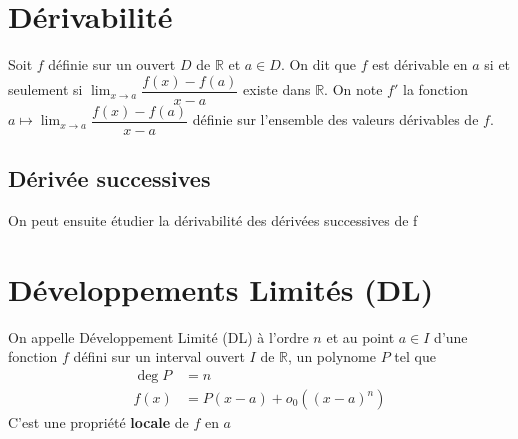 \documentclass[11pt,colorlinks]{book}
\theoremstyle{mytheoremstyle}
\theoremstyle{mytheoremstyle}
\theoremstyle{mytheoremstyle}
\theoremstyle{mytheoremstyle}
\theoremstyle{mytheoremstyle}
\theoremstyle{mytheoremstyle}
\theoremstyle{mytheoremstyle}
\theoremstyle{mytheoremstyle}
\theoremstyle{myproblemstyle}
\def\mbb#1{\mathbb{#1}}
\def\bR{\mbb{R}}
\begin{document}
  \section{Dérivabilité}
  \begin{definition}
    Soit $f$ définie sur un ouvert $D$ de $\bR$ et $a \in D$.  
    On dit que $f$ est dérivable en $a$ si et seulement si $\lim_{x \to a} \dfrac{f(x) - f(a)}{x - a}$ existe dans $\bR$.  
    On note $f'$ la fonction $a \mapsto \lim_{x \to a} \dfrac{f(x) - f(a)}{x - a}$ définie sur l'ensemble des valeurs dérivables de $f$.
  \end{definition}
  \subsection{Dérivée successives}
  On peut ensuite étudier la dérivabilité des dérivées successives de f
  \section{Développements Limités (DL)}
  \begin{definition}
    On appelle Développement Limité (DL) à l'ordre $n$ et au point $a \in I$ d'une fonction $f$ défini sur un interval ouvert $I$ de $\bR$, un polynome $P$ tel que
    \begin{align*}
      \deg P &= n \\ 
      f(x) &= P(x-a) + o_0((x-a)^n)
    \end{align*}
    C'est une propriété \textbf{locale} de $f$ en $a$ 
  \end{definition}
\end{document}
